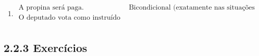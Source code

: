 \begin{enumerate}
\begin{enumerate}
				\item
			    \[\begin{array}{ll}    
				\text{A propina ser\'a paga.} & \text{Bicondicional (exatamente nas situa\c{c}\~oes em que \ldots)} \\
				\text{O deputado vota como instru\'ido por Jo\~ao.} & \\
				\end{array}
				\]
	 
			\end{enumerate}

	\end{enumerate}


	\subsection{2.2.3 Exerc\'icios}
	
